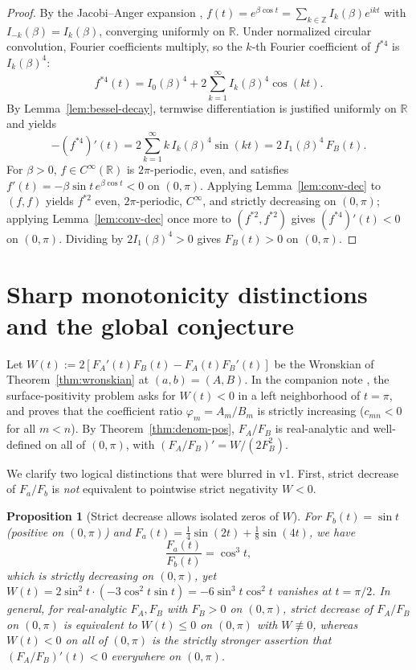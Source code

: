 \documentclass[11pt]{article}
\newtheorem{proposition}[theorem]{Proposition}
\theoremstyle{remark}
\begin{document}
\begin{proof}
By the Jacobi--Anger expansion \cite[10.35.2]{DLMF}, $f(t) = e^{\beta\cos t} = \sum_{k\in\mathbb{Z}} I_k(\beta) e^{ikt}$
with $I_{-k}(\beta) = I_k(\beta)$, converging uniformly on $\mathbb{R}$. Under normalized
circular convolution, Fourier coefficients multiply, so the $k$-th Fourier coefficient of
$f^{*4}$ is $I_k(\beta)^4$:
\[
f^{*4}(t) = I_0(\beta)^4 + 2\sum_{k=1}^\infty I_k(\beta)^4 \cos(kt).
\]
By Lemma~\ref{lem:bessel-decay}, termwise differentiation is justified uniformly on
$\mathbb{R}$ and yields
\[
-(f^{*4})'(t) = 2\sum_{k=1}^\infty k\,I_k(\beta)^4\sin(kt) = 2\,I_1(\beta)^4\,F_B(t).
\]
For $\beta > 0$, $f \in C^\infty(\mathbb{R})$ is $2\pi$-periodic, even, and satisfies
$f'(t) = -\beta\sin t\,e^{\beta\cos t} < 0$ on $(0,\pi)$. Applying
Lemma~\ref{lem:conv-dec} to $(f,f)$ yields $f^{*2}$ even, $2\pi$-periodic, $C^\infty$,
and strictly decreasing on $(0,\pi)$; applying Lemma~\ref{lem:conv-dec} once more to
$(f^{*2}, f^{*2})$ gives $(f^{*4})'(t) < 0$ on $(0,\pi)$. Dividing by
$2 I_1(\beta)^4 > 0$ gives $F_B(t) > 0$ on $(0,\pi)$.
\end{proof}

\section{Sharp monotonicity distinctions and the global conjecture}
\label{sec:conjecture}

Let $W(t) := 2[F_A'(t)F_B(t) - F_A(t)F_B'(t)]$ be the Wronskian of Theorem~\ref{thm:wronskian}
at $(a,b)=(A,B)$. In the companion note \cite{PhiLemma}, the surface-positivity problem
asks for $W(t) < 0$ in a left neighborhood of $t = \pi$, and proves that the coefficient
ratio $\varphi_m = A_m/B_m$ is strictly increasing ($c_{mn} < 0$ for all $m < n$).
By Theorem~\ref{thm:denom-pos}, $F_A/F_B$ is real-analytic and well-defined on all of
$(0,\pi)$, with $(F_A/F_B)' = W/(2F_B^2)$.

We clarify two logical distinctions that were blurred in v1. First, strict decrease of
$F_a/F_b$ is \emph{not} equivalent to pointwise strict negativity $W < 0$.

\begin{proposition}[Strict decrease allows isolated zeros of $W$]
\label{prop:strict-vs-neg}
For $F_b(t) = \sin t$ (positive on $(0,\pi)$) and
$F_a(t) = \tfrac{1}{4}\sin(2t) + \tfrac{1}{8}\sin(4t)$, we have
\[
\frac{F_a(t)}{F_b(t)} = \cos^3 t,
\]
which is strictly decreasing on $(0,\pi)$, yet
$W(t) = 2\sin^2 t \cdot (-3\cos^2 t \sin t) = -6\sin^3 t\cos^2 t$ vanishes at $t = \pi/2$.
In general, for real-analytic $F_A, F_B$ with $F_B > 0$ on $(0,\pi)$, strict decrease of
$F_A/F_B$ on $(0,\pi)$ is equivalent to $W(t) \le 0$ on $(0,\pi)$ with $W \not\equiv 0$,
whereas $W(t) < 0$ on all of $(0,\pi)$ is the strictly stronger assertion that
$(F_A/F_B)'(t) < 0$ everywhere on $(0,\pi)$.
\end{proposition}
\end{document}
